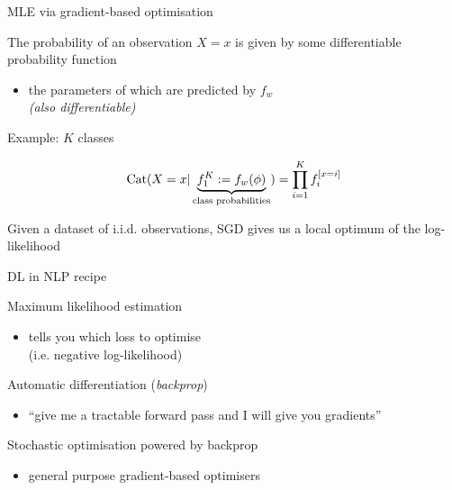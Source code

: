 \documentclass[14pt]{beamer}
\begin{document}
\begin{frame}{MLE via gradient-based optimisation}

The probability of an observation $X=x$ is given by some \alert{differentiable} probability function
\begin{itemize}
	\item the parameters of which are predicted by $f_w$\\
	\emph{(also differentiable)}
\end{itemize}

Example: $K$ classes
\begin{small}
\begin{equation*}
\operatorname{Cat}(X=x|\underbrace{f_1^K := f_w(\phi)}_{\text{class probabilities}}) = \prod_{i=1}^K f_i^{[x=i]} 
\end{equation*}
\end{small}

Given a dataset of i.i.d. observations, SGD gives us a local optimum of the log-likelihood %


\end{frame}



\begin{frame}{DL in NLP recipe}



	Maximum likelihood estimation
	\begin{itemize}
		\item  tells you which \alert{loss} to optimise \\
		(i.e. negative log-likelihood)
	\end{itemize}
	
	Automatic differentiation (\emph{backprop})
	\begin{itemize}
		\item ``give me a tractable forward pass and I will give you \alert{gradients}''
	\end{itemize}
	
	Stochastic optimisation powered by backprop
	\begin{itemize}
		\item general purpose gradient-based optimisers
	\end{itemize}

\end{frame}
\end{document}
